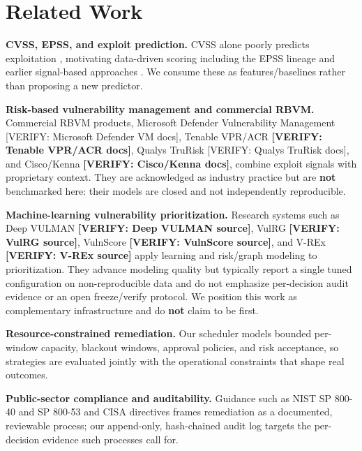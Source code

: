 \section{Related Work}

\textbf{CVSS, EPSS, and exploit prediction.} CVSS alone poorly predicts exploitation
\cite{allodi2014comparing}, motivating data-driven scoring including the EPSS lineage
\cite{jacobs2021epss} and earlier signal-based approaches \cite{sabottke2015vulnerability}.
We consume these as features/baselines rather than proposing a new predictor.

\textbf{Risk-based vulnerability management and commercial RBVM.} Commercial RBVM
products, Microsoft Defender Vulnerability Management [VERIFY: Microsoft Defender
VM docs], Tenable VPR/ACR \textbf{[VERIFY: Tenable VPR/ACR docs]}, Qualys TruRisk [VERIFY:
Qualys TruRisk docs], and Cisco/Kenna \textbf{[VERIFY: Cisco/Kenna docs]}, combine exploit
signals with proprietary context. They are acknowledged as industry practice but
are \textbf{not} benchmarked here: their models are closed and not independently
reproducible.

\textbf{Machine-learning vulnerability prioritization.} Research systems such as Deep
VULMAN \textbf{[VERIFY: Deep VULMAN source]}, VulRG \textbf{[VERIFY: VulRG source]}, VulnScore
\textbf{[VERIFY: VulnScore source]}, and V-REx \textbf{[VERIFY: V-REx source]} apply learning and
risk/graph modeling to prioritization. They advance modeling quality but typically
report a single tuned configuration on non-reproducible data and do not emphasize
per-decision audit evidence or an open freeze/verify protocol. We position this
work as complementary infrastructure and do \textbf{not} claim to be first.

\textbf{Resource-constrained remediation.} Our scheduler models bounded per-window
capacity, blackout windows, approval policies, and risk acceptance, so strategies
are evaluated jointly with the operational constraints that shape real outcomes.

\textbf{Public-sector compliance and auditability.} Guidance such as NIST SP 800-40
\cite{nist80040r4} and SP 800-53 \cite{nist80053r5} and CISA directives \cite{cisa_bod2201}
frames remediation as a documented, reviewable process; our append-only,
hash-chained audit log targets the per-decision evidence such processes call for.
